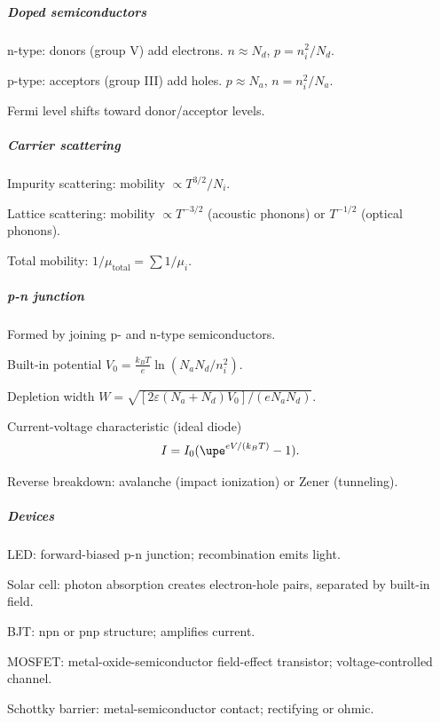 \subparagraph{Doped semiconductors}

\begin{enumext}
  \item n-type: donors (group V) add electrons.
  $n \approx N_d$, $p = n_i^2/N_d$.
  \item p-type: acceptors (group III) add holes.
  $p \approx N_a$, $n = n_i^2/N_a$.
\end{enumext}
Fermi level shifts toward donor/acceptor levels.

\subparagraph{Carrier scattering}

\begin{enumext}
  \item Impurity scattering: mobility $\propto T^{3/2}/N_i$.
  \item Lattice scattering: mobility $\propto T^{-3/2}$ (acoustic phonons)
  or $T^{-1/2}$ (optical phonons).
  \item Total mobility: $1/\mu_{\text{total}} = \sum 1/\mu_i$.
\end{enumext}

\subparagraph{p-n junction}

Formed by joining p- and n-type semiconductors.
\begin{enumext}
  \item Built-in potential $V_0 = \frac{k_B T}{e} \ln(N_a N_d / n_i^2)$.
  \item Depletion
  width $W = \sqrt{[2\varepsilon (N_a+N_d) V_0]/(e N_a N_d)}$.
  \item Current-voltage characteristic (ideal diode)
  \[
    I = I_0 (\upe^{eV/(k_B T)} - 1).
  \]
  \item Reverse breakdown: avalanche (impact ionization) or Zener (tunneling).
\end{enumext}

\subparagraph{Devices}

\begin{enumext}
  \item LED: forward-biased p-n junction; recombination emits light.
  \item Solar cell: photon absorption creates electron-hole pairs,
  separated by built-in field.
  \item BJT: npn or pnp structure; amplifies current.
  \item MOSFET: metal-oxide-semiconductor field-effect transistor;
  voltage-controlled channel.
  \item Schottky barrier: metal-semiconductor contact; rectifying or ohmic.
\end{enumext}

